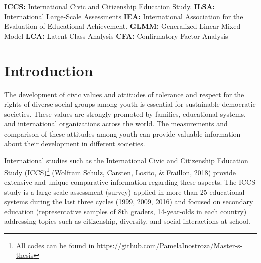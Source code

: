 \documentclass[12pt,a4paper,oneside]{reedthesis}
\begin{document}
  \begin{listabbrev}
    \textbf{ICCS:} International Civic and Citizenship Education Study. \newline
    \textbf{ILSA:} International Large-Scale Assessments \newline
    \textbf{IEA:} International Association for the Evaluation of Educational Achievement. \newline
    \textbf{GLMM:} Generalized Linear Mixed Model \newline
    \textbf{LCA:} Latent Class Analysis \newline
    \textbf{CFA:} Confirmatory Factor Analysis \newline
  \end{listabbrev}
  \hypersetup{linkcolor=black}
  \setcounter{secnumdepth}{2}
  \setcounter{tocdepth}{2}
  \tableofcontents


  \listoftables

  \listoffigures


\mainmatter %
\pagestyle{fancyplain} %

\hypertarget{introduction}{%
\chapter{Introduction}\label{introduction}}

The development of civic values and attitudes of tolerance and respect for the rights of diverse social groups among youth is essential for sustainable democratic societies. These values are strongly promoted by families, educational systems, and international organizations across the world. The measurements and comparison of these attitudes among youth can provide valuable information about their development in different societies.

International studies such as the International Civic and Citizenship Education Study (ICCS)\footnote{All codes can be found in \url{https://github.com/PamelaInostroza/Master-s-thesis}} (Wolfram Schulz, Carsten, Losito, \& Fraillon, 2018) provide extensive and unique comparative information regarding these aspects. The ICCS study is a large-scale assessment (survey) applied in more than 25 educational systems during the last three cycles (1999, 2009, 2016) and focused on secondary education (representative samples of 8th graders, 14-year-olds in each country) addressing topics such as citizenship, diversity, and social interactions at school.
\end{document}
